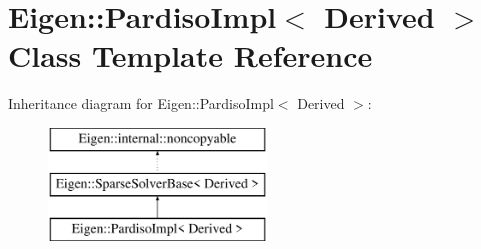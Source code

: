 \hypertarget{class_eigen_1_1_pardiso_impl}{}\section{Eigen\+::Pardiso\+Impl$<$ Derived $>$ Class Template Reference}
\label{class_eigen_1_1_pardiso_impl}
Inheritance diagram for Eigen\+::Pardiso\+Impl$<$ Derived $>$\+:\begin{figure}[H]
\begin{center}
\leavevmode
\includegraphics[height=3.000000cm]{class_eigen_1_1_pardiso_impl}
\end{center}
\end{figure}
